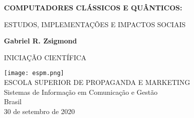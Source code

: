 \begin{titlepage}
    \begin{center}
        \vspace*{1cm}
        \LARGE
        \textbf{COMPUTADORES CLÁSSICOS E QUÂNTICOS:}
        
        \vspace{0.5cm}
        \large
        ESTUDOS, IMPLEMENTAÇÕES E IMPACTOS SOCIAIS
        
        \vspace{1.5cm}
        
        \textbf{Gabriel R. Zsigmond}
        \vfill
        
        INICIAÇÃO CIENTÍFICA
        
        \vspace{0.8cm}
        
        \texttt{[image: espm.png]}\\
        \large
        ESCOLA SUPERIOR DE PROPAGANDA E MARKETING\\
        Sistemas de Informação em Comunicação e Gestão\\
        Brasil\\
        30 de setembro de 2020\\
        
    \end{center}
\end{titlepage}